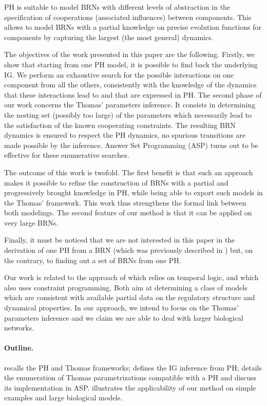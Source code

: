 PH is suitable to model BRNs with different levels of abstraction in the specification of
cooperations (associated influences) between components.
This allows to model BRNs with a partial knowledge on precise evolution functions for components
by capturing the largest (the most general) dynamics.

The objectives of the work presented in this paper are the following.
Firstly, we show that starting from one PH model, it is possible to find back the underlying IG.
We perform an exhaustive search for the possible interactions on one component from all the
others, consistently with the knowledge of the dynamics that these interactions lead to and that are
expressed in PH.
The second phase of our work concerns the Thomas' parameters inference.
It consists in determining the nesting set (possibly too large) of the parameters which necessarily
lead to the satisfaction of the known cooperating constraints.
The resulting BRN dynamics is ensured to respect the PH dynamics, \ie no spurious transitions are
made possible by the inference.
Answer Set Programming (ASP) \cite{Baral03} turns out to be effective for these enumerative searches.

The outcome of this work is twofold.
The first benefit is that such an approach makes it possible to refine the construction of
BRNs with a partial and progressively brought knowledge in PH, while being able to export such
models in the Thomas' framework.
This work thus strengthens the formal link between both modelings.
The second feature of our method is that it can be applied on very large BRNs.

Finally, it must be noticed that we are not interested in this paper in the derivation of one
PH from a BRN (which was previously described in \cite{PMR10-TCSB}) but, on the contrary, to finding out
a set of BRNs from one PH.

Our work is related to the approach of \cite{Khalis09} which relies on temporal logic, and \cite{20646302,DBLP:conf/ipcat/CorblinFTCT12} which also uses constraint programming. Both aim at determining a class of models which are consistent with available partial data on the regulatory structure and dynamical properties.
In our approach, we intend to focus on the Thomas' parameters inference and we claim we are able to deal with larger biological networks.

\paragraph{Outline.}
 recalls the PH and Thomas frameworks;
 defines the IG inference from PH;
 details the enumeration of Thomas parametrizations compatible with a PH
and discuss its implementation in ASP.
 illustrates the applicability of our method on simple examples
and large biological models.

